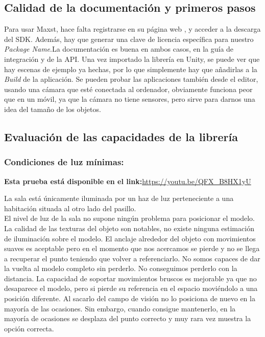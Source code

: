 \subsection{Calidad de la documentación y primeros pasos}
Para usar Maxst, hace falta registrarse en su página web \cite{Maxst}, y acceder a la descarga del SDK. Además, hay que generar una clave de licencia específica para nuestro \textit{Package Name}.La documentación  es buena en ambos casos, en la guía de integración y de la API. Una vez importado la librería en Unity, se puede ver que hay escenas de ejemplo ya hechas, por lo que simplemente hay que añadirlas a la \textit{Build} de la aplicación. Se pueden probar las aplicaciones también desde el editor, usando una cámara que esté conectada al ordenador, obviamente funciona peor que en un móvil, ya que la cámara no tiene sensores, pero sirve para darnos una idea del tamaño de los objetos. 
\subsection{Evaluación de las capacidades de la librería}
\subsubsection{Condiciones de luz mínimas:}

\textbf{Esta prueba está disponible en el link:}\url{https://youtu.be/QFX_B8HX1yU}

La sala está únicamente iluminada por un haz de luz perteneciente a una habitación situada al otro lado del pasillo.\\

El nivel de luz de la sala no supone ningún problema para posicionar el modelo. La calidad de las texturas del objeto son notables, no existe ninguna estimación de iluminación sobre el modelo. El anclaje alrededor del objeto con movimientos suaves es aceptable pero en el momento que nos acercamos se pierde y no se llega a recuperar el punto teniendo que volver a referenciarlo.  No somos capaces de dar la vuelta al modelo completo sin perderlo. No conseguimos perderlo con la distancia. La capacidad de soportar movimientos bruscos es mejorable ya que no desaparece el modelo, pero si pierde su referencia en el espacio moviéndolo a una posición diferente. Al sacarlo del campo de visión no lo posiciona de nuevo en la mayoría de las ocasiones. Sin embargo, cuando consigue mantenerlo, en la mayoría de ocasiones se desplaza del punto correcto y muy rara vez muestra la opción correcta.

